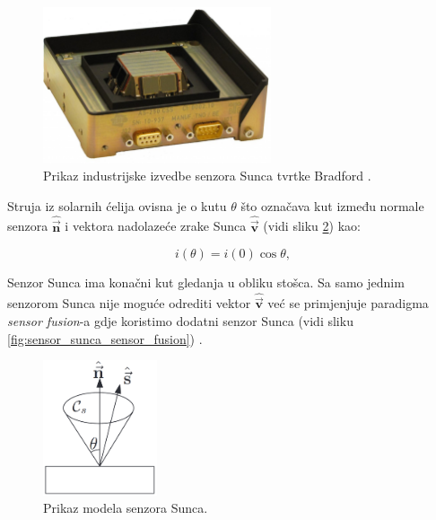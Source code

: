 \documentclass[times, utf8, diplomski, numeric]{templates/template}
\begin{document}
{{{{                \begin{figure}[htb]
                \centering
                \includegraphics[width=0.6\textwidth]{images/sensor_sunca_industrija.jpg}
                \caption{Prikaz industrijske izvedbe senzora Sunca tvrtke Bradford \cite{sunSensorBradford}.}
                \label{fig:sensor_sunca_industrija}
                \end{figure}

                Struja iz solarnih ćelija ovisna je o kutu $\theta$ što označava kut između normale senzora $\hat{\overrightarrow{\textbf{n}}}$ i vektora nadolazeće zrake Sunca $\hat{\overrightarrow{\textbf{v}}}$ (vidi sliku \ref{fig:sensor_sunca}) kao:

                \begin{equation}
                    i(\theta) = i(0)\cos\theta,
                \end{equation}

                Senzor Sunca ima konačni kut gledanja u obliku stošca. Sa samo jednim senzorom Sunca nije moguće odrediti vektor $\hat{\overrightarrow{\textbf{v}}}$ već se primjenjuje paradigma \emph{sensor fusion}-a gdje koristimo dodatni senzor Sunca (vidi sliku \ref{fig:sensor_sunca_sensor_fusion}) \cite{adcsKnjiga}.

                \begin{figure}[htb]
                \centering
                \includegraphics[width=0.3\textwidth]{images/sensor_sunca.png}
                \caption{Prikaz modela senzora Sunca.}
                \label{fig:sensor_sunca}
                \end{figure}

}}}}
\end{document}
